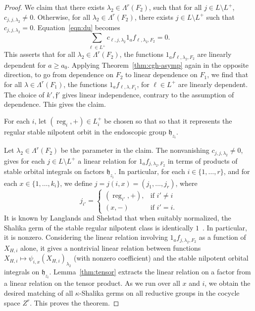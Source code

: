 \documentclass[12pt]{amsart}
\newcommand{\op}[1]{\operatorname{#1}}
\def\s{{\mathfrak{f}}}
\newcommand{\fh}{\mathfrak{h}}
\theoremstyle{plain}
\theoremstyle{definition}
\begin{document}
\begin{proof}
We claim that there exists $\lambda_2\in \Lambda^r({F_2})$, such that for all $j\in
L\setminus L^+$,
$c_{j,j,\lambda_2}\ne 0$.  Otherwise, for all $\lambda_2\in \Lambda^r(F_2)$, there exists
$j\in L\setminus L^+$ such that $c_{j,j,\lambda_2}=0$.  Equation~\ref{eqn:du}
becomes
\begin{equation}\label{eqn:du2}
\sum_{\ell\in L^+} c_{\ell,j,\lambda_2}1_af_{\ell,\lambda_2,F_2}  = 0.
\end{equation}
This asserts that for all $\lambda_2\in \Lambda^r(F_2)$, the functions
$1_af_{\ell,\lambda_2,F_2}$ are linearly dependent for $a\ge a_0$.  Applying
Theorem~\ref{thm:cgh-asymp} again in the opposite direction, to go from
dependence on $F_2$ to linear dependence on $F_1$, we find that for all
$\lambda\in \Lambda^r(F_1)$, the functions $1_af_{\ell,\lambda,F_1}$, for $\ell\in L^+$ are linearly
dependent.  The choice of $k',\s'$ gives linear independence, contrary to
the assumption of dependence.  This gives the claim.

For each $i$, let $(\op{reg}_i,+)\in L^+_i$ be chosen so that so that
it represents the regular stable nilpotent orbit in the endoscopic
group $\fh_{z_i}$.

Let $\lambda_2\in \Lambda^r(F_2)$ be the parameter in the claim.  The
nonvanishing $c_{j,j,\lambda_2}\ne 0$, gives for each $j\in L\setminus L^+$ a linear relation for
$1_af_{j,\lambda_2,F_2}$ in terms of products of stable orbital integrals on
factors $\fh_{z_i}$.  In particular, for each $i\in\{1,\ldots,r\}$, and for each $x\in\{1,\ldots,k_i\}$,
we define
$j = j(i,x) = (j_1,\ldots,j_r)$, where 
\[
j_{i'} = \begin{cases} (\op{reg}_{i'},+), &\text{if } i'\ne i\\
       (x,-) & \text{if } i' = i.
  \end{cases}
\]
It is known by Langlands and Shelstad that when suitably normalized,
the Shalika germ of the stable regular nilpotent class is identically
$1$~\cite{LSxf}.  In particular, it is nonzero.  Considering the linear relation
involving $1_af_{j,\lambda_2,F_2}$ as a function of $X_{H,i}$ alone,
it gives a nontrivial linear relation between functions
$X_{H,i}\mapsto\psi_{i,x}(X_{H,i})_{\lambda_2}$ (with nonzero
coefficient) and the stable nilpotent orbital integrals on
$\fh_{z_i}$.  Lemma~\ref{thm:tensor} extracts the linear relation on
a factor from a linear relation on the tensor product.  As we run over
all $x$ and $i$, we obtain the desired matching of all
$\kappa$-Shalika germs on all reductive groups in the cocycle space
$Z^r$.  This proves the theorem.
\end{proof}
\end{document}
